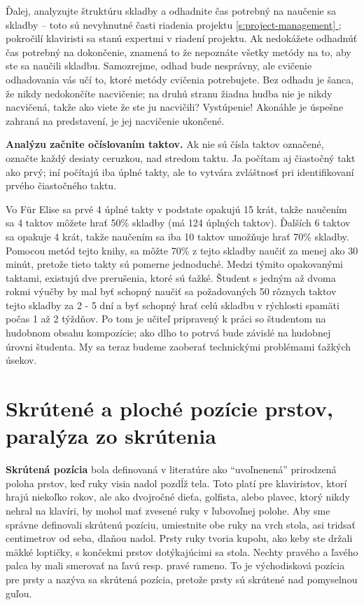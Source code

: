 \documentclass[11pt,a4paper]{book}
\newcommand*{\fullref}[1]{\hyperref[{#1}]{\ref*{#1} \nameref*{#1}}} %
\begin{document}
Ďalej, analyzujte štruktúru skladby a odhadnite čas potrebný na naučenie sa skladby – toto sú nevyhnutné časti riadenia projektu \fullref{s:project-management}; pokročilí klaviristi sa stanú expertmi v riadení projektu. Ak nedokážete odhadnúť čas potrebný na dokončenie, znamená to že nepoznáte všetky metódy na to, aby ste sa naučili skladbu. Samozrejme, odhad bude nesprávny, ale cvičenie odhadovania vás učí to, ktoré metódy cvičenia potrebujete. Bez odhadu je šanca, že nikdy nedokončíte nacvičenie; na druhú stranu žiadna hudba nie je nikdy nacvičená, takže ako viete že ste ju nacvičili? Vystúpenie! Akonáhle je úspešne zahraná na predstavení, je jej nacvičenie ukončené.

\textbf{Analýzu začnite očíslovaním taktov.} Ak nie sú čísla taktov označené, označte každý desiaty ceruzkou, nad stredom taktu. Ja počítam aj čiastočný takt ako prvý; iní počítajú iba úplné takty, ale to vytvára zvláštnosť pri identifikovaní prvého čiastočného taktu. 

Vo Für Elise sa prvé 4 úplné takty v podstate opakujú 15 krát, takže naučením sa 4 taktov môžete hrať 50\% skladby (má 124 úplných taktov). Ďalších 6 taktov sa opakuje 4 krát, takže naučením sa iba 10 taktov umožňuje hrať 70\% skladby. Pomocou metód tejto knihy, sa môžte 70\% z tejto skladby naučiť za menej ako 30 minút, pretože tieto takty sú pomerne jednoduché. Medzi týmito opakovanými taktami, existujú dve prerušenia, ktoré sú ťažké. Študent s jedným až dvoma rokmi výučby by mal byť schopný naučiť sa požadovaných 50 rôznych taktov tejto skladby za 2 - 5 dní a byť schopný hrať celú skladbu v rýchlosti spamäti počas 1 až 2 týždňov. Po tom je učiteľ pripravený k práci so študentom na hudobnom obsahu kompozície; ako dlho to potrvá bude závislé na hudobnej úrovni študenta. My sa teraz budeme zaoberať technickými problémami ťažkých úsekov.

\section{Skrútené a ploché pozície prstov, paralýza zo skrútenia}\label{s:curled-positions}
\textbf{Skrútená pozícia} bola definovaná v literatúre ako “uvoľnenená” prirodzená poloha prstov, keď ruky visia nadol pozdĺž tela. Toto platí pre klaviristov, ktorí hrajú niekoľko rokov, ale ako dvojročné dieťa, golfista, alebo plavec, ktorý nikdy nehral na klavíri, by mohol mať zvesené ruky v ľubovoľnej polohe. Aby sme správne definovali skrútenú pozíciu, umiestnite obe ruky na vrch stola, asi tridsať centimetrov od seba, dlaňou nadol. Prsty ruky tvoria kupolu, ako keby ste držali mäkké loptičky, s končekmi prstov dotýkajúcimi sa stola. Nechty pravého a ľavého palca by mali smerovať na ľavú resp. pravé rameno. To je východisková pozícia pre prsty a nazýva sa skrútená pozícia, pretože prsty sú skrútené nad pomyselnou guľou.
\end{document}
